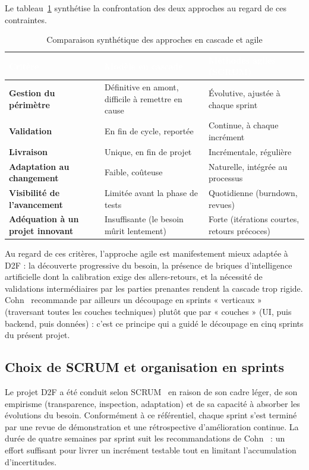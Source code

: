 \documentclass[12pt,a4paper]{report}
\renewcommand{\thead}[1]{\cellcolor{espritblue}\textcolor{white}{\textbf{#1}}}
\begin{document}
Le tableau~\ref{tab:cmp_methodo} synthétise la confrontation des deux
approches au regard de ces contraintes.

\begin{table}[H]
\centering
\caption{Comparaison synthétique des approches en cascade et agile}
\label{tab:cmp_methodo}
{\small\renewcommand{\arraystretch}{1.2}
\begin{tabularx}{\textwidth}{>{\bfseries}p{4cm} X X}
\toprule
\thead{Critère} & \thead{Modèle en cascade} & \thead{Méthodes agiles (SCRUM)} \\
\midrule
Gestion du périmètre & Définitive en amont, difficile à remettre en cause & Évolutive, ajustée à chaque sprint \\
Validation & En fin de cycle, reportée & Continue, à chaque incrément \\
Livraison & Unique, en fin de projet & Incrémentale, régulière \\
Adaptation au changement & Faible, coûteuse & Naturelle, intégrée au processus \\
Visibilité de l'avancement & Limitée avant la phase de tests & Quotidienne (burndown, revues) \\
Adéquation à un projet innovant & Insuffisante (le besoin mûrit lentement) & Forte (itérations courtes, retours précoces) \\
\bottomrule
\end{tabularx}}
\end{table}

Au regard de ces critères, l'approche agile est manifestement mieux adaptée à
D2F : la découverte progressive du besoin, la présence de briques d'intelligence
artificielle dont la calibration exige des allers-retours, et la nécessité de
validations intermédiaires par les parties prenantes rendent la cascade trop
rigide. Cohn~\cite{cohn2009succeeding} recommande par ailleurs un découpage en
sprints « verticaux » (traversant toutes les couches techniques) plutôt que par
« couches » (UI, puis backend, puis données) : c'est ce principe qui a guidé le
découpage en cinq sprints du présent projet.

\subsection{Choix de SCRUM et organisation en sprints}

Le projet D2F a été conduit selon SCRUM~\cite{schwaber2020scrum} en raison de
son cadre léger, de son empirisme (transparence, inspection, adaptation) et de
sa capacité à absorber les évolutions du besoin. Conformément à ce référentiel,
chaque sprint s'est terminé par une revue de démonstration et une rétrospective
d'amélioration continue. La durée de quatre semaines par sprint suit les
recommandations de Cohn~\cite{cohn2009succeeding} : un effort suffisant pour
livrer un incrément testable tout en limitant l'accumulation d'incertitudes.
\end{document}
